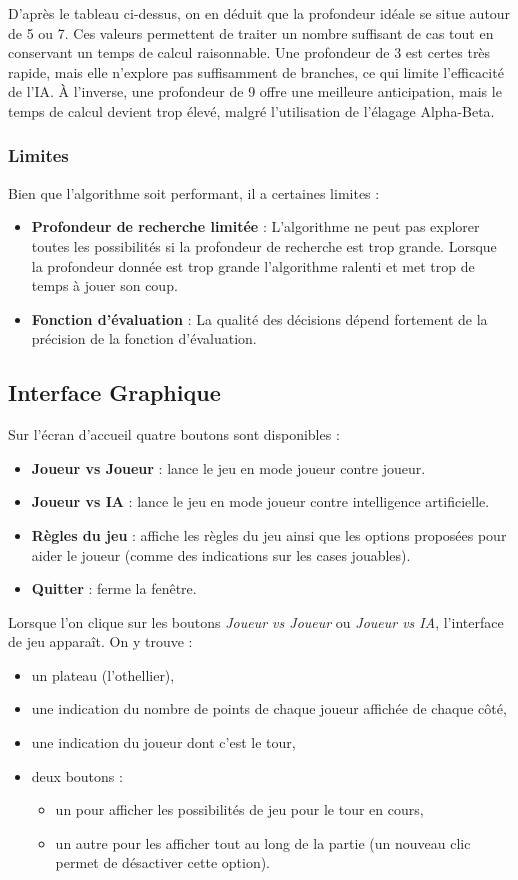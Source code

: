 \documentclass[a4paper,12pt]{article}
\begin{document}
D’après le tableau ci-dessus, on en déduit que la profondeur idéale se situe autour de 5 ou 7.
Ces valeurs permettent de traiter un nombre suffisant de cas tout en conservant un temps de calcul raisonnable.
Une profondeur de 3 est certes très rapide, mais elle n’explore pas suffisamment de branches, ce qui limite l'efficacité de l'IA.
À l’inverse, une profondeur de 9 offre une meilleure anticipation, mais le temps de calcul devient trop élevé, malgré l’utilisation de l’élagage Alpha-Beta.


\subsubsection{Limites}
Bien que l'algorithme soit performant, il a certaines limites :
\begin{itemize}
    \item \textbf{Profondeur de recherche limitée} : L'algorithme ne peut pas explorer toutes les possibilités si la profondeur de recherche est trop grande. Lorsque la profondeur donnée est trop grande l'algorithme ralenti et met trop de temps à jouer son coup.
    \item \textbf{Fonction d'évaluation} : La qualité des décisions dépend fortement de la précision de la fonction d'évaluation.
\end{itemize}
\subsection{Interface Graphique}

Sur l'écran d'accueil quatre boutons sont disponibles :
\begin{itemize}
    \item \textbf{Joueur vs Joueur} : lance le jeu en mode joueur contre joueur.
    \item \textbf{Joueur vs IA} : lance le jeu en mode joueur contre intelligence artificielle.
    \item \textbf{Règles du jeu} : affiche les règles du jeu ainsi que les options proposées pour aider le joueur (comme des indications sur les cases jouables).
    \item \textbf{Quitter} : ferme la fenêtre.
\end{itemize}

Lorsque l’on clique sur les boutons \textit{Joueur vs Joueur} ou \textit{Joueur vs IA}, l’interface de jeu apparaît. On y trouve :
\begin{itemize}
    \item un plateau (l’othellier),
    \item une indication du nombre de points de chaque joueur affichée de chaque côté,
    \item une indication du joueur dont c’est le tour,
    \item deux boutons :
    \begin{itemize}
        \item un pour afficher les possibilités de jeu pour le tour en cours,
        \item un autre pour les afficher tout au long de la partie (un nouveau clic permet de désactiver cette option).
    \end{itemize}
\end{itemize}
\end{document}
